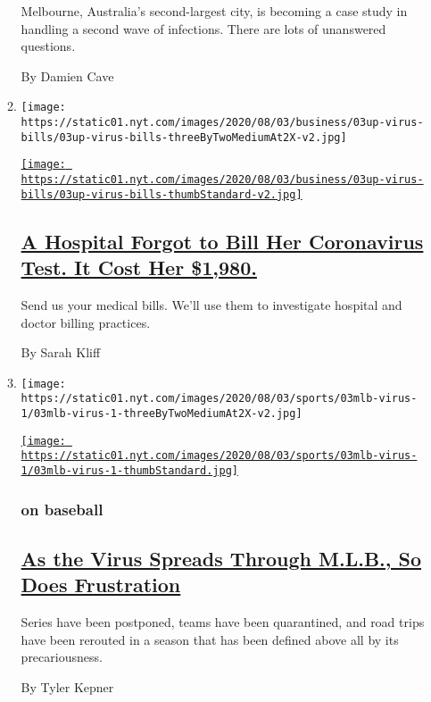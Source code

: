 \begin{enumerate}
\begin{enumerate}
    Melbourne, Australia's second-largest city, is becoming a case study
    in handling a second wave of infections. There are lots of
    unanswered questions.

    By Damien Cave
  \item
    \texttt{[image: https://static01.nyt.com/images/2020/08/03/business/03up-virus-bills/03up-virus-bills-threeByTwoMediumAt2X-v2.jpg]}

    \href{/2020/08/03/upshot/nj-coronavirus-medical-bill.html}{\texttt{[image: https://static01.nyt.com/images/2020/08/03/business/03up-virus-bills/03up-virus-bills-thumbStandard-v2.jpg]}}

    \hypertarget{a-hospital-forgot-to-bill-her-coronavirus-test-it-cost-her-1980}{%
    \subsection{\texorpdfstring{\href{/2020/08/03/upshot/nj-coronavirus-medical-bill.html}{A
    Hospital Forgot to Bill Her Coronavirus Test. It Cost Her
    \$1,980.}}{A Hospital Forgot to Bill Her Coronavirus Test. It Cost Her \$1,980.}}\label{a-hospital-forgot-to-bill-her-coronavirus-test-it-cost-her-1980}}

    Send us your medical bills. We'll use them to investigate hospital
    and doctor billing practices.

    By Sarah Kliff
  \item
    \texttt{[image: https://static01.nyt.com/images/2020/08/03/sports/03mlb-virus-1/03mlb-virus-1-threeByTwoMediumAt2X-v2.jpg]}

    \href{/2020/08/03/sports/baseball/mlb-coronavirus-outbreak.html}{\texttt{[image: https://static01.nyt.com/images/2020/08/03/sports/03mlb-virus-1/03mlb-virus-1-thumbStandard.jpg]}}

    \hypertarget{on-baseball}{%
    \subsubsection{on baseball}\label{on-baseball}}

    \hypertarget{as-the-virus-spreads-through-mlb-so-does-frustration}{%
    \subsection{\texorpdfstring{\href{/2020/08/03/sports/baseball/mlb-coronavirus-outbreak.html}{As
    the Virus Spreads Through M.L.B., So Does
    Frustration}}{As the Virus Spreads Through M.L.B., So Does Frustration}}\label{as-the-virus-spreads-through-mlb-so-does-frustration}}

    Series have been postponed, teams have been quarantined, and road
    trips have been rerouted in a season that has been defined above all
    by its precariousness.

    By Tyler Kepner
  \end{enumerate}
\end{enumerate}

